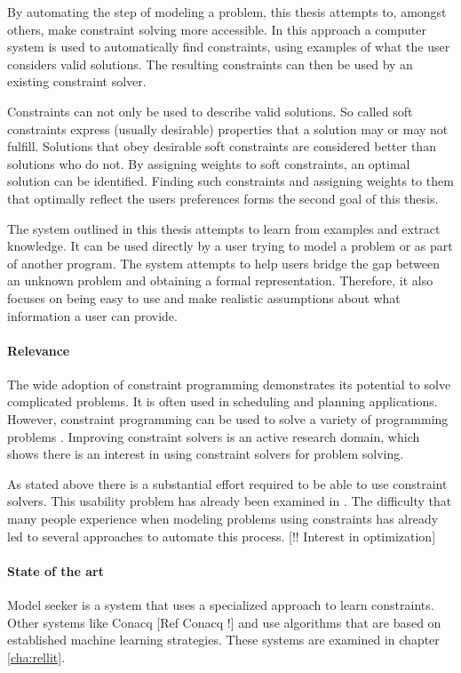 By automating the step of modeling a problem, this thesis attempts to, amongst others, make constraint solving more accessible. In this approach a computer system is used to automatically find constraints, using examples of what the user considers valid solutions. The resulting constraints can then be used by an existing constraint solver.

Constraints can not only be used to describe valid solutions. So called soft constraints express (usually desirable) properties that a solution may or may not fulfill. Solutions that obey desirable soft constraints are considered better than solutions who do not. By assigning weights to soft constraints, an optimal solution can be identified. Finding such constraints and assigning weights to them that optimally reflect the users preferences forms the second goal of this thesis. 

The system outlined in this thesis attempts to learn from examples and extract knowledge. It can be used directly by a user trying to model a problem or as part of another program. The system attempts to help users bridge the gap between an unknown problem and obtaining a formal representation. Therefore, it also focuses on being easy to use and make realistic assumptions about what information a user can provide. 

\paragraph{Relevance}
The wide adoption of constraint programming demonstrates its potential to solve complicated problems. It is often used in scheduling and planning applications. However, constraint programming can be used to solve a variety of programming problems \cite{Dymchenki:GoogleCodeJamEclipse}. Improving constraint solvers is an active research domain, which shows there is an interest in using constraint solvers for problem solving.

As stated above there is a substantial effort required to be able to use constraint solvers. This usability problem has already been examined in \cite{Wallace:PrinciplesCP}. The difficulty that many people experience when modeling problems using constraints has already led to several approaches to automate this process. [!! Interest in optimization]

\paragraph{State of the art}
\textbf{\color{red}{[!! Unfinished]}}
Model seeker \cite{Beldiceanu:ModelSeeker} is a system that uses a specialized approach to learn constraints. Other systems like Conacq [Ref Conacq !] and \cite{Lallouet:LearningCP} use algorithms that are based on established machine learning strategies. These systems are examined in chapter \ref{cha:rellit}.

